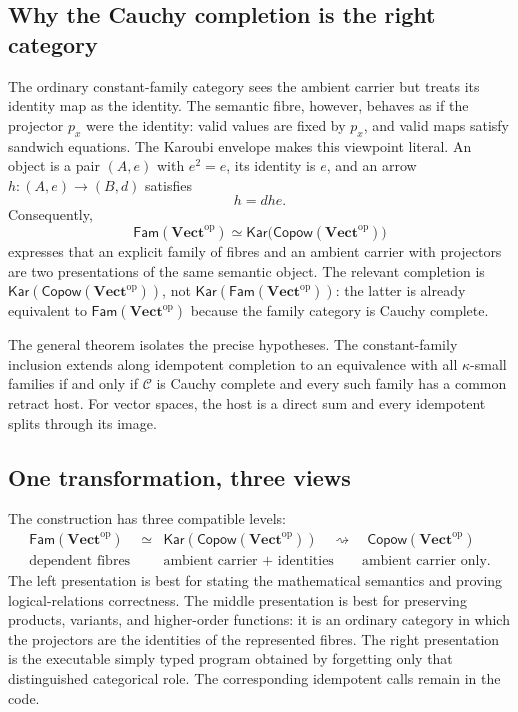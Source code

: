 \documentclass[runningheads,envcountsame]{llncs}
\newcommand{\Vectop}{\mathbf{Vect}^{\mathrm{op}}}
\newcommand{\Copow}{\mathsf{Copow}}
\newcommand{\Fam}{\mathsf{Fam}}
\newcommand{\Kar}{\mathsf{Kar}}
\newcommand{\semiarrow}{\rightsquigarrow}
\begin{document}
\subsection{Why the Cauchy completion is the right category}

The ordinary constant-family category sees the ambient carrier but treats its
identity map as the identity.  The semantic fibre, however, behaves as if the
projector $p_x$ were the identity: valid values are fixed by $p_x$, and valid
maps satisfy sandwich equations.  The Karoubi envelope makes this viewpoint
literal.  An object is a pair $(A,e)$ with $e^2=e$, its identity is $e$, and an
arrow $h:(A,e)\to(B,d)$ satisfies
$$
h=dhe.
$$
Consequently,
$$
\Fam(\Vectop)
\simeq
\Kar\bigl(\Copow(\Vectop)\bigr)
$$
expresses that an explicit family of fibres and an ambient carrier with
projectors are two presentations of the same semantic object.  The relevant
completion is $\Kar(\Copow(\Vectop))$, not
$\Kar(\Fam(\Vectop))$: the latter is already equivalent to
$\Fam(\Vectop)$ because the family category is Cauchy complete.

The general theorem isolates the precise hypotheses.  The constant-family
inclusion extends along idempotent completion to an equivalence with all
$\kappa$-small families if and only if $\mathcal C$ is Cauchy complete and every
such family has a common retract host.
For vector spaces, the host is a direct sum and every idempotent splits through
its image.

\subsection{One transformation, three views}

The construction has three compatible levels:
$$
\begin{array}{ccl}
\Fam(\Vectop)
&\simeq&
\Kar(\Copow(\Vectop))
\quad\semiarrow\quad
\Copow(\Vectop)\\[2mm]
\text{dependent fibres}
&&
\text{ambient carrier + identities}
\qquad
\text{ambient carrier only.}
\end{array}
$$
The left presentation is best for stating the mathematical semantics and proving
logical-relations correctness.  The middle presentation is best for preserving
products, variants, and higher-order functions: it is an ordinary category in
which the projectors are the identities of the represented fibres.  The right
presentation is the executable simply typed program obtained by forgetting only
that distinguished categorical role.  The corresponding idempotent calls remain in the code.
\end{document}
